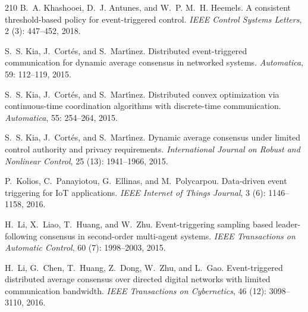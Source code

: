 \documentclass{autart}
\begin{document}
{\begin{thebibliography}{210}
B.~A. Khashooei, D.~J. Antunes, and W.~P. M.~H. Heemels.
\newblock A consistent threshold-based policy for event-triggered control.
\newblock \emph{IEEE Control Systems Letters}, 2 (3):
  447--452, 2018.

S.~S. Kia, J.~Cort\'es, and S.~Mart{\'\i}nez.
\newblock Distributed event-triggered communication for dynamic average
  consensus in networked systems.
\newblock \emph{Automatica}, 59: 112--119, 2015{}.

S.~S. Kia, J.~Cort\'es, and S.~Mart{\'\i}nez.
\newblock Distributed convex optimization via continuous-time coordination
  algorithms with discrete-time communication.
\newblock \emph{Automatica}, 55: 254--264, 2015{}.

S.~S. Kia, J.~Cort{\'e}s, and S.~Mart{\'\i}nez.
\newblock Dynamic average consensus under limited control authority and privacy
  requirements.
\newblock \emph{International Journal on Robust and Nonlinear Control},
  25 (13): 1941--1966, 2015{}.

P.~Kolios, C.~Panayiotou, G.~Ellinas, and M.~Polycarpou.
\newblock Data-driven event triggering for {IoT} applications.
\newblock \emph{IEEE Internet of Things Journal}, 3 (6):
  1146--1158, 2016.

H.~Li, X.~Liao, T.~Huang, and W.~Zhu.
\newblock Event-triggering sampling based leader-following consensus in
  second-order multi-agent systems.
\newblock \emph{IEEE Transactions on Automatic Control}, 60
  (7): 1998--2003, 2015.

H.~Li, G.~Chen, T.~Huang, Z.~Dong, W.~Zhu, and L.~Gao.
\newblock Event-triggered distributed average consensus over directed digital
  networks with limited communication bandwidth.
\newblock \emph{IEEE Transactions on Cybernetics}, 46 (12):
  3098--3110, 2016{}.


\end{thebibliography}}
\end{document}
